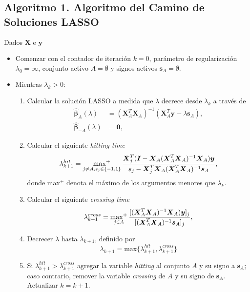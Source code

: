 \documentclass[a4paper,12pt]{report}
\begin{document}
{
\subsection*{Algoritmo 1. Algoritmo del Camino de Soluciones LASSO}
Dados $\boldsymbol{X}$ e $\boldsymbol{y}$
\begin{itemize}
\item Comenzar con el contador de iteración $k=0$, parámetro de regularización $\lambda_0=\infty$, conjunto activo $A=\emptyset$ y signos activos $\boldsymbol{s}_A=\emptyset$.
\item Mientras $\lambda_k > 0$:
\begin{enumerate}
\item Calcular la solución LASSO a medida que $\lambda$ decrece desde $\lambda_k$ a través de
\begin{equation*}
\begin{aligned}
\boldsymbol{\hat{\beta}}_A(\lambda)&=(\boldsymbol{X}_A^T\boldsymbol{X}_A)^{-1}(\boldsymbol{X}_A^T\boldsymbol{y}-\lambda \boldsymbol{s}_A), \\ \boldsymbol{\hat{\beta}}_{-A}(\lambda)&=\boldsymbol{0},
\end{aligned}
\end{equation*}
\item Calcular el siguiente \textit{hitting time}
\begin{equation*}
\lambda_{k+1}^{hit}=\operatornamewithlimits{max^+}\limits_{j\neq A, s_j \in \{-1,1\}} \frac{\boldsymbol{X}_j^T(\boldsymbol{I}-\boldsymbol{X}_A(\boldsymbol{X}_A^T\boldsymbol{X}_A)^{-1}\boldsymbol{X}_A)\boldsymbol{y}}{s_j-\boldsymbol{X}_j^T\boldsymbol{X}_A(\boldsymbol{X}_A^T\boldsymbol{X}_A)^{-1}\boldsymbol{s}_A},
\end{equation*}
donde max$^+$ denota el máximo de los argumentos menores que $\lambda_k$.
\item Calcular el siguiente \textit{crossing time}
\begin{equation*}
\lambda_{k+1}^{cross}=\operatornamewithlimits{max^+}\limits_{j \in A} \frac{[(\boldsymbol{X}_A^T\boldsymbol{X}_A)^{-1}\boldsymbol{X}_A)\boldsymbol{y}]_j}{[(\boldsymbol{X}_A^T\boldsymbol{X}_A)^{-1}\boldsymbol{s}_A]_j},
\end{equation*}
\item Decrecer $\lambda$ hasta $\lambda_{k+1}$, definido por
\begin{equation*}
\lambda_{k+1}=\text{max}\{\lambda_{k+1}^{hit},\lambda_{k+1}^{cross}\}
\end{equation*}
\item Si $\lambda_{k+1}^{hit} > \lambda_{k+1}^{cross}$ agregar la variable \textit{hitting} al conjunto $A$ y su signo a $\boldsymbol{s}_A$; caso contrario, remover la variable \textit{crossing} de $A$ y su signo de $\boldsymbol{s}_A$. Actualizar $k=k+1$. 
\end{enumerate}
\end{itemize}
}
\end{document}
